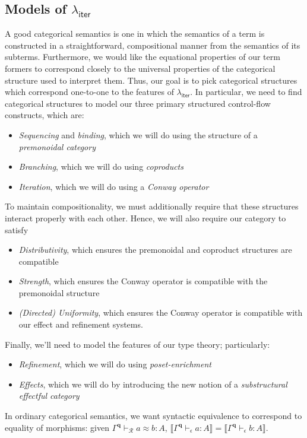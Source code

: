 \documentclass[acmsmall,screen,review]{acmart}
\newcommand{\mc}[1]{\ensuremath{\mathcal{#1}}}
\newcommand{\mb}[1]{\ensuremath{\mathbf{#1}}}
\newcommand{\ms}[1]{\ensuremath{\mathsf{#1}}}
\newcommand{\hasty}[4]{#1 \vdash_{#2} #3: {#4}}
\newcommand{\teqv}{\approx}
\newcommand{\tmeq}[5]{#1 \vdash_{#2} #3 \teqv #4 : {#5}}
\newcommand{\dnt}[1]{\llbracket{#1}\rrbracket}
\newcommand{\subiterexp}{\texorpdfstring{\(\lambda_{\ms{iter}}\)}{lambda-iter}}
\begin{document}
\subsection{Models of \subiterexp{}}

A good categorical semantics is one in which the semantics of a term is constructed in a
straightforward, compositional manner from the semantics of its subterms. Furthermore, we would like
the equational properties of our term formers to correspond closely to the universal properties of
the categorical structure used to interpret them. Thus, our goal is to pick categorical structures
which correspond  one-to-one to the features of \subiterexp{}. In particular, we need to find
categorical structures to model our three primary structured control-flow constructs, which are:
\begin{itemize}
  \item \emph{Sequencing} and \emph{binding}, which we will do using the structure of a
  \emph{premonoidal category}
  \item \emph{Branching}, which we will do using \emph{coproducts}
  \item \emph{Iteration}, which we will do using a \emph{Conway operator}
\end{itemize}
To maintain compositionality, we must additionally require that these structures interact properly 
with each other. Hence, we will also require our category to satisfy
\begin{itemize}
  \item \emph{Distributivity}, which ensures the premonoidal and coproduct structures are compatible
  \item \emph{Strength}, which ensures the Conway operator is compatible with the premonoidal
  structure
  \item \emph{(Directed) Uniformity}, which ensures the Conway operator is compatible with our
  effect and refinement systems.
\end{itemize}
Finally, we'll need to model the features of our type theory; particularly:
\begin{itemize}
  \item \emph{Refinement}, which we will do using \emph{poset-enrichment}
  \item \emph{Effects}, which we will do by introducing the new notion of a \emph{substructural
  effectful category}
\end{itemize}

In ordinary categorical semantics, we want syntactic equivalence to
correspond to equality of morphisms: given $\tmeq{\Gamma^{\mb{q}}}{\mc{R}}{a}{b}{A}$,
$\dnt{\hasty{\Gamma^{\mb{q}}}{\epsilon}{a}{A}} = \dnt{\hasty{\Gamma^{\mb{q}}}{\epsilon}{b}{A}}$. 
\end{document}
